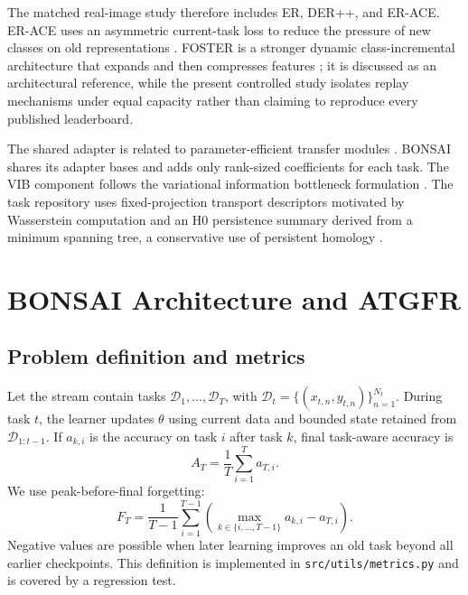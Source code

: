 \documentclass[conference]{IEEEtran}
\newcommand{\BONSAI}{\textsc{BONSAI}}
\begin{document}
The matched real-image study therefore includes ER, DER++, and ER-ACE. ER-ACE
uses an asymmetric current-task loss to reduce the pressure of new classes on
old representations \cite{caccia2022representation}. FOSTER is a stronger
dynamic class-incremental architecture that expands and then compresses
features \cite{wang2022foster}; it is discussed as an architectural reference,
while the present controlled study isolates replay mechanisms under equal
capacity rather than claiming to reproduce every published leaderboard.

The shared adapter is related to parameter-efficient transfer modules
\cite{houlsby2019adapters}. \BONSAI{} shares its adapter bases and adds only
rank-sized coefficients for each task. The VIB component follows the
variational information bottleneck formulation \cite{alemi2017vib}. The task
repository uses fixed-projection transport descriptors motivated by
Wasserstein computation \cite{rabin2011barycenter} and an H0 persistence
summary derived from a minimum spanning tree, a conservative use of
persistent homology \cite{edelsbrunner2002persistence}.

\section{BONSAI Architecture and ATGFR}
\label{sec:method}

\subsection{Problem definition and metrics}

Let the stream contain tasks
\(\mathcal{D}_1,\ldots,\mathcal{D}_T\), with
\(\mathcal{D}_t=\{(x_{t,n},y_{t,n})\}_{n=1}^{N_t}\). During task \(t\), the
learner updates \(\theta\) using current data and bounded state retained from
\(\mathcal{D}_{1:t-1}\). If \(a_{k,i}\) is the accuracy on task \(i\) after
task \(k\), final task-aware accuracy is
\begin{equation}
A_T=\frac{1}{T}\sum_{i=1}^{T}a_{T,i}.
\end{equation}
We use peak-before-final forgetting:
\begin{equation}
F_T=\frac{1}{T-1}\sum_{i=1}^{T-1}
\left(\max_{k\in\{i,\ldots,T-1\}}a_{k,i}-a_{T,i}\right).
\label{eq:forgetting}
\end{equation}
Negative values are possible when later learning improves an old task beyond
all earlier checkpoints. This definition is implemented in
\texttt{src/utils/metrics.py} and is covered by a regression test.
\end{document}
